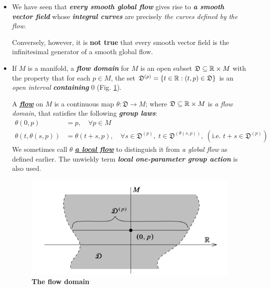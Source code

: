\documentclass[11pt]{article}
\begin{document}
\begin{itemize}
\item We have seen that \textbf{\emph{every smooth global flow}} gives rise to \textbf{\emph{a smooth vector field}} whose \textbf{\emph{integral curves}} are precisely \emph{the curves defined by the flow}. 

Conversely, however, it is \textbf{not true} that every smooth vector field is the infinitesimal generator of a smooth global flow.

\item \begin{definition}
If $M$ is a manifold, a \emph{\textbf{flow domain}} for $M$ is an open subset $\mathfrak{D} \subseteq {\mathbb R} \times M$ with the property that for each $p \in M$,
the set $\mathfrak{D}^{(p)} = \left\{t \in {\mathbb R}: (t, p) \in \mathfrak{D}\right\}$ is an \emph{open interval} \emph{\textbf{containing}} $0$ (Fig. \ref{fig: flow_domain}).

A \underline{\emph{\textbf{flow}}} on $M$ is a continuous map $\theta: \mathfrak{D} \rightarrow M$; where  $\mathfrak{D} \subseteq {\mathbb R} \times M$ is \emph{a flow domain}, that satisfies the following \emph{\textbf{group laws}}: 
\begin{align}
\theta(0, p) &=p, \quad \forall p \in M  \label{eqn: local_flow_group_identity}\\
\theta(t, \theta(s, p)) &= \theta(t+s, p), \quad \forall s \in \mathfrak{D}^{(p)}, \; t \in \mathfrak{D}^{(\theta(s, p))},\; (\text{i.e. }t+s \in \mathfrak{D}^{(p)})  \label{eqn: local_flow_group}
\end{align} We sometimes call $\theta$ \underline{\emph{\textbf{a local flow}}} to distinguish it from \emph{a global flow} as defined earlier. The unwieldy term \emph{\textbf{local one-parameter group action}} is also used.
\end{definition}

\begin{figure}
\begin{minipage}[hb]{1\linewidth}
  \centering
  \centerline{\includegraphics[scale = 0.42]{flow_domain.png}}
\end{minipage}
\caption{\footnotesize{\textbf{The flow domain  \citep{lee2003introduction}}}}
\label{fig: flow_domain}
\end{figure}


\end{itemize}
\end{document}
